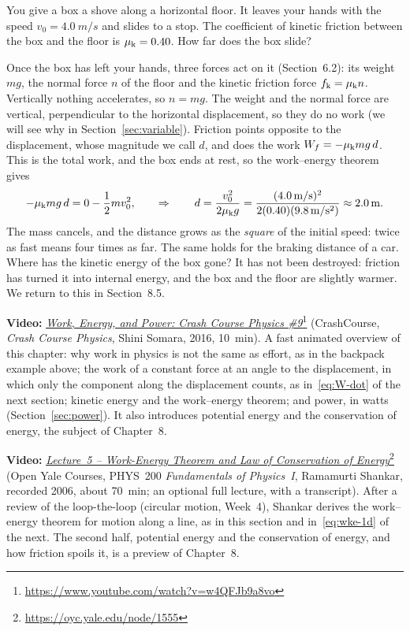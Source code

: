 \documentclass[11pt,a4paper]{article}
\begin{document}
\begin{example}
\setlength{\parskip}{0.5em plus 0.1em}%
You give a box a shove along a horizontal floor. It leaves your hands with the speed
$v_0 = \qty{4.0}{m/s}$ and slides to a stop. The coefficient of kinetic friction between the box and
the floor is $\mu_{\mathrm{k}} = 0.40$. How far does the box slide?

Once the box has left your hands, three forces act on it (Section~6.2): its weight $mg$, the normal
force $n$ of the floor and the kinetic friction force $f_{\mathrm{k}} = \mu_{\mathrm{k}} n$. Vertically nothing
accelerates, so $n = mg$. The weight and the normal force are vertical, perpendicular to the
horizontal displacement, so they do no work (we will see why in Section~\ref{sec:variable}). Friction
points opposite to the displacement, whose magnitude we call $d$, and does the work
$W_f = -\mu_{\mathrm{k}} mg\,d$. This is the total work, and the box ends at rest, so the work--energy
theorem gives
\[
  -\mu_{\mathrm{k}} mg\,d = 0 - \frac12 mv_0^2 , \qquad\Rightarrow\qquad
  d = \frac{v_0^2}{2\mu_{\mathrm{k}} g} = \frac{(\qty{4.0}{m/s})^2}{2(0.40)(\qty{9.8}{m/s^2})}
    \approx \qty{2.0}{m} .
\]
The mass cancels, and the distance grows as the \emph{square} of the initial speed: twice as fast
means four times as far. The same holds for the braking distance of a car. Where has the kinetic
energy of the box gone? It has not been destroyed: friction has turned it into internal energy, and
the box and the floor are slightly warmer. We return to this in Section~8.5.
\end{example}

\begin{aside}
\textbf{Video:}
\href{https://www.youtube.com/watch?v=w4QFJb9a8vo}{\emph{Work, Energy, and Power: Crash Course
Physics \#9}}\footnote{\url{https://www.youtube.com/watch?v=w4QFJb9a8vo}} (CrashCourse,
\emph{Crash Course Physics}, Shini Somara, 2016, 10~min). A fast animated overview of this
chapter: why work in physics is not the same as effort, as in the backpack example above; the work
of a constant force at an angle to the displacement, in which only the component along the
displacement counts, as in~\eqref{eq:W-dot} of the next section; kinetic energy and the
work--energy theorem; and power, in watts (Section~\ref{sec:power}). It also introduces potential
energy and the conservation of energy, the subject of Chapter~8.
\par\smallskip
\textbf{Video:}
\href{https://oyc.yale.edu/node/1555}{\emph{Lecture~5 -- Work-Energy Theorem and Law of
Conservation of Energy}}\footnote{\url{https://oyc.yale.edu/node/1555}} (Open Yale Courses,
PHYS~200 \emph{Fundamentals of Physics~I}, Ramamurti Shankar, recorded 2006, about 70~min; an
optional full lecture, with a transcript). After a review of the loop-the-loop (circular motion,
Week~4), Shankar derives the work--energy theorem for motion along a line, as in this section and
in~\eqref{eq:wke-1d} of the next. The second half, potential energy and the conservation of
energy, and how friction spoils it, is a preview of Chapter~8.
\end{aside}
\end{document}
